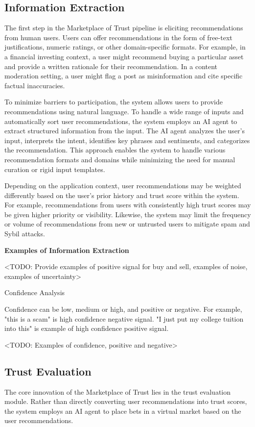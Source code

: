 \documentclass{article}
\begin{document}
\subsection{Information Extraction} 
The first step in the Marketplace of Trust pipeline is eliciting recommendations from human users. Users can offer recommendations in the form of free-text justifications, numeric ratings, or other domain-specific formats. For example, in a financial investing context, a user might recommend buying a particular asset and provide a written rationale for their recommendation. In a content moderation setting, a user might flag a post as misinformation and cite specific factual inaccuracies.

To minimize barriers to participation, the system allows users to provide recommendations using natural language. To handle a wide range of inputs and automatically sort user recommendations, the system employs an AI agent to extract structured information from the input. The AI agent analyzes the user's input, interprets the intent, identifies key phrases and sentiments, and categorizes the recommendation. This approach enables the system to handle various recommendation formats and domains while minimizing the need for manual curation or rigid input templates.

Depending on the application context, user recommendations may be weighted differently based on the user's prior history and trust score within the system. For example, recommendations from users with consistently high trust scores may be given higher priority or visibility. Likewise, the system may limit the frequency or volume of recommendations from new or untrusted users to mitigate spam and Sybil attacks.

\textbf{Examples of Information Extraction}

<TODO: Provide examples of positive signal for buy and sell, examples of noise, examples of uncertainty>

Confidence Analysis

Confidence can be low, medium or high, and positive or negative. For example, "this is a scam" is high confidence negative signal. "I just put my college tuition into this" is example of high confidence positive signal.

<TODO: Examples of confidence, positive and negative>


\subsection{Trust Evaluation}
The core innovation of the Marketplace of Trust lies in the trust evaluation module. Rather than directly converting user recommendations into trust scores, the system employs an AI agent to place bets in a virtual market based on the user recommendations.
\end{document}
